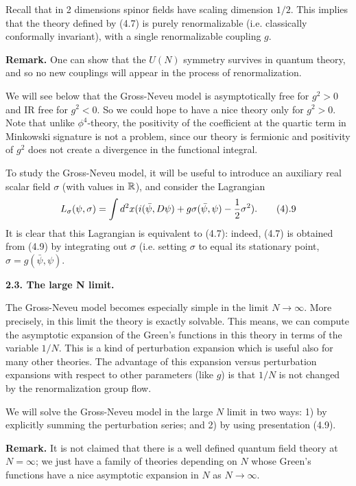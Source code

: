 Recall that in 2 dimensions spinor fields have scaling dimension $1/2$. 
This implies that the theory defined by (4.7) is purely renormalizable
(i.e. classically conformally invariant), with a single renormalizable 
coupling $g$. 

{\bf Remark.} One can show 
that the $U(N)$ symmetry survives in quantum theory, and 
so no new couplings will appear in the process of renormalization. 

We will see below that the Gross-Neveu model is asymptotically free 
for $g^2>0$ and IR free for $g^2<0$. So we could hope to have a nice theory 
only for $g^2>0$. Note that unlike $\phi^4$-theory, the positivity of the 
coefficient at the quartic term in Minkowski signature is not a problem, 
since our theory is fermionic and positivity of $g^2$ does not create 
a divergence in the functional integral.  

To study the Gross-Neveu model, it will be useful to introduce 
an auxiliary real scalar field $\sigma$ (with values in $\Bbb R$), and consider 
the Lagrangian
$$
L_\sigma(\psi,\sigma)=\int d^2x(i(\bar\psi,D\psi)+g\sigma(\bar\psi,\psi)-\frac{1}{2}
\sigma^2).\tag 4.9
$$
It is clear that this Lagrangian is equivalent to (4.7): indeed, 
(4.7) is obtained from (4.9) by integrating out $\sigma$ 
(i.e. setting $\sigma$ to equal its stationary point, $\sigma=g(\bar\psi,\psi)$. 

{\bf 2.3. The large N limit.}

The Gross-Neveu model becomes especially simple in the limit $N\to\infty$. 
More precisely, in this limit the theory is exactly solvable. 
This means, we can compute the asymptotic expansion of 
the Green's functions in this theory in terms of the variable $1/N$. This is 
a kind of perturbation expansion which is useful also 
for many other theories. The advantage of this expansion versus
perturbation expansions with respect to other parameters (like $g$) is that 
$1/N$ is not changed by the renormalization group flow. 
 
We will solve the Gross-Neveu model in the large $N$ limit 
in two ways: 1) by explicitly summing the perturbation series; 
and 2) by using presentation (4.9).

{\bf Remark.} It is not claimed that there is a well defined quantum field 
theory at $N=\infty$; we just have a family of theories depending on $N$ whose 
Green's functions have a nice asymptotic expansion in $N$ as $N\to\infty$.

